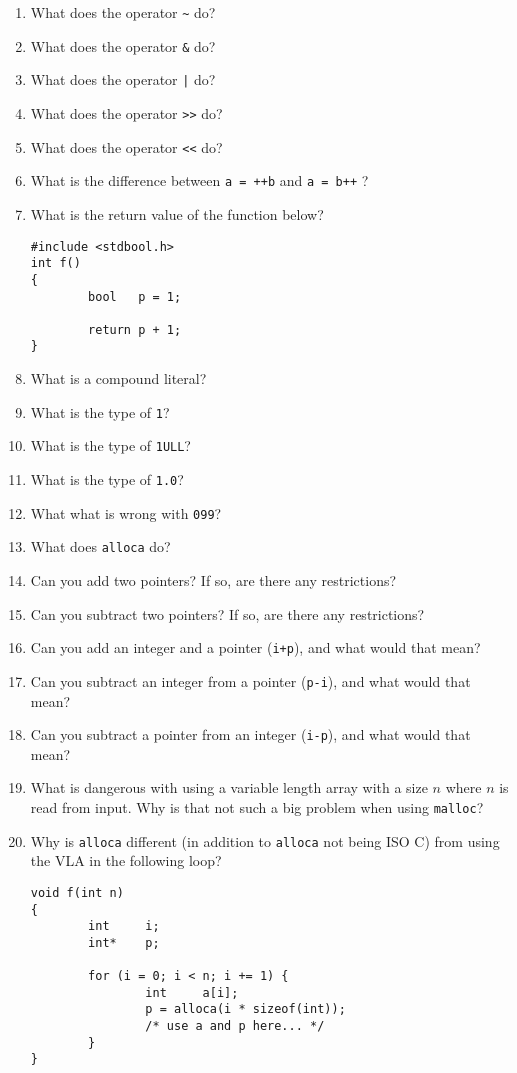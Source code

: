 \documentclass{article}
\begin{document}
\begin{enumerate}
\item What does  the operator \verb!~! do?
\item What does  the operator \verb!&! do?
\item What does  the operator \verb!|! do?
\item What does  the operator \verb!>>! do?
\item What does  the operator \verb!<<! do?
\item What is the difference between \verb!a = ++b! and \verb!a = b++! ?
\item What is the return value of the function below?
\begin{verbatim}
#include <stdbool.h>
int f()
{
        bool   p = 1;

        return p + 1;
}
\end{verbatim}
\item What is a compound literal?
\item What is the type of {\tt 1}? 
\item What is the type of {\tt 1ULL}? 
\item What is the type of {\tt 1.0}? 
\item What what is wrong with {\tt 099}?
\item What does {\tt alloca} do? 
\item Can you add two pointers? If so, are there any restrictions?
\item Can you subtract two pointers? If so, are there any restrictions?
\item Can you add an integer and a pointer (\verb!i+p!), and what would that mean?
\item Can you subtract an integer from a pointer (\verb!p-i!), and what would that mean?
\item Can you subtract a pointer from an integer (\verb!i-p!), and what would that mean?
\item What is dangerous with using a variable length array with a size $n$ where $n$ is read from input. Why is that not such a big problem when using \verb.malloc.?

\item Why is {\tt alloca} different (in addition to {\tt alloca} not being ISO C) from using the VLA in the following loop? 
\begin{verbatim}
void f(int n)
{
        int     i;
        int*    p;

        for (i = 0; i < n; i += 1) {
                int     a[i];
                p = alloca(i * sizeof(int));
                /* use a and p here... */
        }
}
\end{verbatim}


\end{enumerate}
\end{document}
